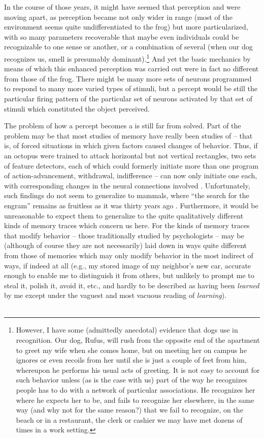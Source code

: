 In the course of those years, it might have seemed that perception and  were moving apart, as perception became not only wider in range (most of the environment seems quite undifferentiated to the frog) but more particularized, with so many parameters recoverable that maybe even individuals could be recognizable to one sense or another, or a combination of several (when our dog recognizes us, smell is presumably dominant).\footnote{However, I have some (admittedly anecdotal) evidence that dogs use  in recognition. Our dog, Rufus, will rush from the opposite end of the apartment to greet my wife when she comes home, but on meeting her on campus he ignores or even recoils from her until she is just a couple of feet from him, whereupon he performs his usual acts of greeting. It is not easy to account for such behavior unless (as is the case with us) part of the way he recognizes people has to do with a network of particular associations. He recognizes her where he expects her to be, and fails to recognize her elsewhere, in the same way (and why not for the same reason?) that we fail to recognize, on the beach or in a restaurant, the clerk or cashier we may have met dozens of times in a work setting.} And yet the basic mechanics by means of which this enhanced perception was carried out were in fact no different from those of the frog. There might be many more sets of neurons programmed to respond to many more varied types of stimuli, but a percept would be still the particular firing pattern of the particular set of neurons activated by that set of stimuli which constituted the object perceived.

The problem of how a percept becomes a  is still far from solved. Part of the problem may be that most studies of memory have really been studies of  -- that is, of forced situations in which given factors caused changes of behavior. Thus, if an octopus were trained to attack horizontal but not vertical rectangles, two sets of feature detectors, each of which could formerly initiate more than one program of action-advancement, withdrawal, indifference -- can now only initiate one each, with corresponding changes in the neural connections involved \citep{Bradley1975}. Unfortunately, such findings do not seem to generalize to mammals, where ``the search for the engram'' remains as fruitless as it was thirty years ago \citep{Lashley1950}. Furthermore, it would be unreasonable to expect them to generalize to the quite qualitatively different kinds of memory traces which concern us here. For the kinds of memory traces that modify behavior -- those traditionally studied by psychologists -- may be (although of course they are not necessarily) laid down in ways quite different from those of memories which may only modify behavior in the most indirect of ways, if indeed at all (e.g., my stored  image of my neighbor's new car, accurate enough to enable me to distinguish it from others, but unlikely to prompt me to steal it, polish it, avoid it, etc., and hardly to be described as having been \textit{learned} by me except under the vaguest and most vacuous reading of \textit{learning}).\\\\

